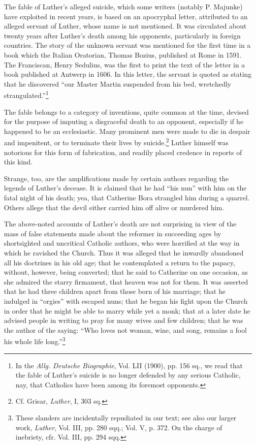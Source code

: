 The fable of Luther’s alleged suicide, which some writers (notably
P. Majunke) have exploited in recent years, is based on an apocryphal
letter, attributed to an alleged servant of Luther, whose name is not
mentioned. It was circulated about twenty years after Luther’s death
among his opponents, particularly in foreign countries. The story of
the unknown servant was mentioned for the first time in a book
which the Italian Oratorian, Thomas Bozius, published at Rome in
1591. The Franciscan, Henry Sedulius, was the first to print the text
of the letter in a book published at Antwerp in 1606. In this letter,
the servant is quoted as stating that he discovered “our Master Martin
suspended from his bed, wretchedly strangulated.”\footnote
{In the \textit{Allg. Deutsche Biographie}, Vol. LII (1900), pp. 156 sq., we read that the fable
of Luther’s suicide is no longer defended by any serious Catholic, nay, that Catholics have
been among its foremost opponents.}

The fable belongs to a category of inventions, quite common at the
time, devised for the purpose of imputing a disgraceful death to
an opponent, especially if he happened to be an ecclesiastic. Many
prominent men were made to die in despair and impenitent, or to terminate
their lives by suicide.\footnote{Cf. Grisar, \textit{Luther}, I, 303 sq.}
Luther himself was notorious for this
form of fabrication, and readily placed credence in reports of this
kind.

Strange, too, are the amplifications made by certain authors regarding
the legends of Luther’s decease. It is claimed that he had “his nun”
with him on the fatal night of his death; yea, that Catherine Bora
strangled him during a quarrel. Others allege that the devil either carried
him off alive or murdered him.

The above-noted accounts of Luther’s death are not surprising
in view of the mass of false statements made about the reformer in
succeeding ages by shortsighted and uncritical Catholic authors, who
were horrified at the way in which he ravished the Church. Thus it
was alleged that he inwardly abandoned all his doctrines in his old
age; that he contemplated a return to the papacy, without, however,
being converted; that he said to Catherine on one occasion, as she
admired the starry firmament, that heaven was not for them. It was
asserted that he had three children apart from those born of his marriage;
that he indulged in “orgies” with escaped nuns; that he began
his fight upon the Church in order that he might be able to marry
while yet a monk; that at a later date he advised people in writing to
pray for many wives and few children; that he was the author of the
saying: “Who loves not woman, wine, and song, remains a fool his
whole life long.”\footnote
{These slanders are incidentally repudiated in our text; see also our larger work, \textit{Luther},
Vol. III, pp. 280 sqq.; Vol. V, p. 372. On the charge of inebriety, cfr. Vol. III, pp. 294
sqq.}

